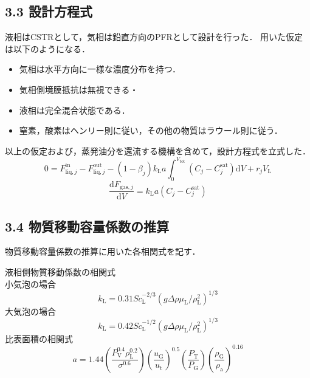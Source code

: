 \documentclass[a4j, titlepage]{jsarticle}
\newcommand{\diff}{\mathrm{d}}
\begin{document}
\subsection*{3.3 設計方程式}
液相はCSTRとして，気相は鉛直方向のPFRとして設計を行った．
用いた仮定は以下のようになる．
\begin{itemize}
    \item 気相は水平方向に一様な濃度分布を持つ．\\
    \item 気相側境膜抵抗は無視できる・\\
    \item 液相は完全混合状態である．\\
    \item 窒素，酸素はヘンリー則に従い，その他の物質はラウール則に従う．
\end{itemize}
以上の仮定および，蒸発油分を還流する機構を含めて，設計方程式を立式した．\\
\begin{equation*}
    0 = F^\text{in}_{\text{liq},j} - F^\text{out}_{\text{liq},j} - (1-\beta_j) k_\mathrm{L}a
    \int^{V_\text{tot}}_0(C_j - C^\text{sat}_j) \diff V + r_j V_\mathrm{L}
\end{equation*}
\begin{equation*}
    \frac{ \diff F_{\text{gas},j}}{\diff V} = k_\mathrm{L}a (C_j - C^\text{sat}_j)
\end{equation*}

\subsection*{3.4 物質移動容量係数の推算}
物質移動容量係数の推算に用いた各相関式を記す．

液相側物質移動係数の相関式\\
小気泡の場合
\begin{equation}
    k_\mathrm{L} = 0.31Sc_\mathrm{L}^{-2/3}(g \Delta \rho \mu_\mathrm{L}/\rho_\mathrm{L}^2)^{1/3}
\end{equation}
大気泡の場合
\begin{equation}
    k_\mathrm{L} = 0.42Sc_\mathrm{L}^{-1/2}(g \Delta \rho \mu_\mathrm{L}/\rho_\mathrm{L}^2)^{1/3}
\end{equation}
比表面積の相関式
\begin{equation}
    a = 1.44 \left( \frac{P_\mathrm{V}^{0.4} \rho_\mathrm{L}^{0.2} }{ \sigma^{0.6}} \right) \left( \frac{u_\mathrm{G}}{u_\mathrm{t}} \right)^{0.5} \left( \frac{P_\mathrm{T}}{P_\mathrm{G}} \right) \left( \frac{\rho_\mathrm{G}}{\rho_\mathrm{a}} \right)^{0.16}
\end{equation}
\end{document}
